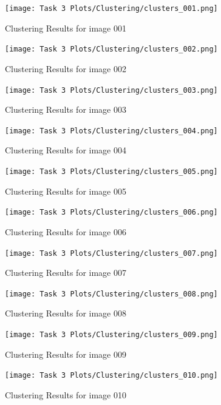 \documentclass[11pt]{report}
\begin{document}
\begin{figure}[H]
    \centering
    \texttt{[image: Task 3 Plots/Clustering/clusters\_001.png]}
    \caption{Clustering Results for image 001}
    \label{fig:clusters1}
\end{figure}
\begin{figure}[H]
    \centering
    \texttt{[image: Task 3 Plots/Clustering/clusters\_002.png]}
    \caption{Clustering Results for image 002}
    \label{fig:clusters2}
\end{figure}
\begin{figure}[H]
    \centering
    \texttt{[image: Task 3 Plots/Clustering/clusters\_003.png]}
    \caption{Clustering Results for image 003}
    \label{fig:clusters3}
\end{figure}
\begin{figure}[H]
    \centering
    \texttt{[image: Task 3 Plots/Clustering/clusters\_004.png]}
    \caption{Clustering Results for image 004}
    \label{fig:clusters4}
\end{figure}
\begin{figure}[H]
    \centering
    \texttt{[image: Task 3 Plots/Clustering/clusters\_005.png]}
    \caption{Clustering Results for image 005}
    \label{fig:clusters5}
\end{figure}
\begin{figure}[H]
    \centering
    \texttt{[image: Task 3 Plots/Clustering/clusters\_006.png]}
    \caption{Clustering Results for image 006}
    \label{fig:clusters6}
\end{figure}
\begin{figure}[H]
    \centering
    \texttt{[image: Task 3 Plots/Clustering/clusters\_007.png]}
    \caption{Clustering Results for image 007}
    \label{fig:clusters7}
\end{figure}
\begin{figure}[H]
    \centering
    \texttt{[image: Task 3 Plots/Clustering/clusters\_008.png]}
    \caption{Clustering Results for image 008}
    \label{fig:clusters8}
\end{figure}
\begin{figure}[H]
    \centering
    \texttt{[image: Task 3 Plots/Clustering/clusters\_009.png]}
    \caption{Clustering Results for image 009}
    \label{fig:clusters9}
\end{figure}
\begin{figure}[H]
    \centering
    \texttt{[image: Task 3 Plots/Clustering/clusters\_010.png]}
    \caption{Clustering Results for image 010}
    \label{fig:clusters10}
\end{figure}
\end{document}
